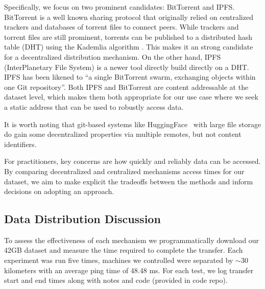 Specifically, we focus on two prominent candidates:
BitTorrent and IPFS.
BitTorrent \cite{cohen_incentives_2003, cohen_bittorrent_2017} is a well known sharing protocol that
  originally relied on centralized trackers and databases of torrent files to connect peers.
While trackers and torrent files are still prominent, torrents can be published to a distributed hash table
  (DHT) using the Kademlia algorithm \cite{maymounkov_kademlia_2002}.
This makes it an strong candidate for a decentralized distribution mechanism.
On the other hand, IPFS (InterPlanetary File System) \cite{benet_ipfs_2014, bieri_overview_2021} is a newer
  tool directly build directly on a DHT.
IPFS has been likened to ``a single BitTorrent swarm, exchanging objects within one Git repository''.
Both IPFS and BitTorrent are content addressable at the dataset level, which makes them both appropriate for
  our use case where we seek a static address that can be used to robustly access data.

It is worth noting that git-based \cite{chacon2014progit} systems like
  HuggingFace~\cite{huggingface_datasets} with large file storage do gain some decentralized
  properties via multiple remotes, but not content identifiers.

For practitioners, key concerns are how quickly and reliably data can be accessed.
By comparing decentralized and centralized mechanisms access times for our dataset, we aim to make
  explicit the tradeoffs between the methods and inform decisions on adopting an approach.



 
\FloatBarrier

\subsection{Data Distribution Discussion}
\label{sec:datset_discuss}

To assess the effectiveness of each mechanism we programmatically download our 42GB dataset and measure the
  time required to complete the transfer.
Each experiment was run five times, machines we controlled were separated by $\sim\!30$ kilometers with an
  average ping time of 48.48 ms.
For each test, we log transfer start and end times along with notes and code (provided in code repo).

